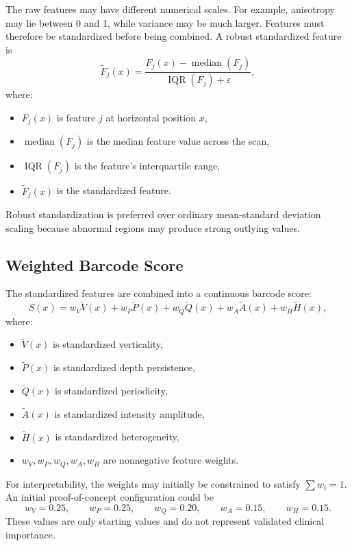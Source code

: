 \documentclass[11pt]{article}
\begin{document}
The raw features may have different numerical scales. For example, anisotropy
may lie between 0 and 1, while variance may be much larger. Features must
therefore be standardized before being combined.
A robust standardized feature is
\[
\widetilde{F}_j(x)
=
\frac{
F_j(x)-\operatorname{median}(F_j)
}{
\operatorname{IQR}(F_j)+\varepsilon
},
\]
where:
\begin{itemize}
    \item \(F_j(x)\) is feature \(j\) at horizontal position \(x\),
    \item \(\operatorname{median}(F_j)\) is the median feature value across the
    scan,
    \item \(\operatorname{IQR}(F_j)\) is the feature's interquartile range,
    \item \(\widetilde{F}_j(x)\) is the standardized feature.
\end{itemize}

Robust standardization is preferred over ordinary mean-standard deviation
scaling because abnormal regions may produce strong outlying values.


\subsection{Weighted Barcode Score}

The standardized features are combined into a continuous barcode score:
\[
S(x)
=
w_V\widetilde{V}(x)
+
w_P\widetilde{P}(x)
+
w_Q\widetilde{Q}(x)
+
w_A\widetilde{A}(x)
+
w_H\widetilde{H}(x),
\]
where:
\begin{itemize}
    \item \(\widetilde{V}(x)\) is standardized verticality,
    \item \(\widetilde{P}(x)\) is standardized depth persistence,
    \item \(\widetilde{Q}(x)\) is standardized periodicity,
    \item \(\widetilde{A}(x)\) is standardized intensity amplitude,
    \item \(\widetilde{H}(x)\) is standardized heterogeneity,
    \item \(w_V,w_P,w_Q,w_A,w_H\) are nonnegative feature weights.
\end{itemize}
For interpretability, the weights may initially be constrained to satisfy $\sum w_i = 1$.
An initial proof-of-concept configuration could be
\[
w_V=0.25,
\qquad
w_P=0.25,
\qquad
w_Q=0.20,
\qquad
w_A=0.15,
\qquad
w_H=0.15.
\]
These values are only starting values and do not represent validated clinical
importance.
\end{document}
